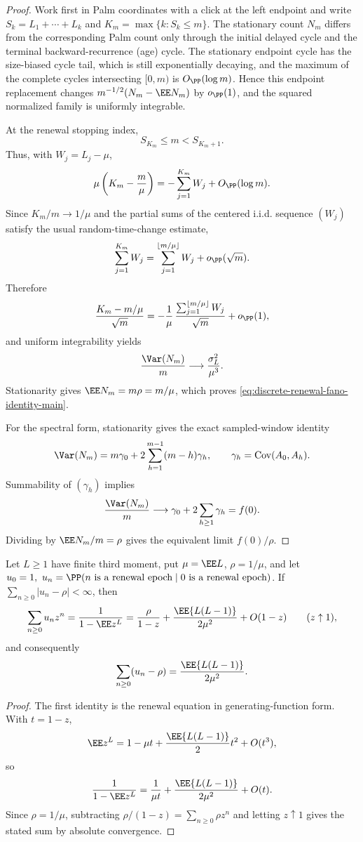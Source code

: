 \begin{proof}
Work first in Palm coordinates with a click at the left endpoint and write
\(S_k=L_1+\cdots+L_k\) and
\(K_m=\max\{k:S_k\le m\}\).  The stationary count \(N_m\) differs from the
corresponding Palm count only through the initial delayed cycle and the
terminal backward-recurrence (age) cycle.  The stationary endpoint cycle has the size-biased
cycle tail, which is still exponentially decaying, and the maximum of the
complete cycles intersecting \([0,m)\) is \(O_{\PP}(\log m)\).  Hence this
endpoint replacement changes \(m^{-1/2}(N_m-\EE N_m)\) by \(o_{\PP}(1)\), and
the squared normalized family is uniformly integrable.

At the renewal stopping index,
\[
S_{K_m}\le m<S_{K_m+1}.
\]
Thus, with \(W_j=L_j-\mu\),
\[
\mu\left(K_m-\frac m\mu\right)
=-\sum_{j=1}^{K_m}W_j+O_{\PP}(\log m).
\]
Since \(K_m/m\to1/\mu\) and the partial sums of the centered i.i.d. sequence
\((W_j)\) satisfy the usual random-time-change estimate,
\[
\sum_{j=1}^{K_m}W_j
=\sum_{j=1}^{\lfloor m/\mu\rfloor}W_j+o_{\PP}(\sqrt m).
\]
Therefore
\[
\frac{K_m-m/\mu}{\sqrt m}
=-\frac1\mu\,
\frac{\sum_{j=1}^{\lfloor m/\mu\rfloor}W_j}{\sqrt m}
+o_{\PP}(1),
\]
and uniform integrability yields
\[
\frac{\Var(N_m)}m
\longrightarrow
\frac{\sigma_L^2}{\mu^3}.
\]
Stationarity gives \(\EE N_m=m\rho=m/\mu\), which proves
\eqref{eq:discrete-renewal-fano-identity-main}.

For the spectral form, stationarity gives the exact sampled-window identity
\[
\Var(N_m)=
m\gamma_0+2\sum_{h=1}^{m-1}(m-h)\gamma_h,\qquad
\gamma_h=\operatorname{Cov}(A_0,A_h).
\]
Summability of \((\gamma_h)\) implies
\[
\frac{\Var(N_m)}m\longrightarrow
\gamma_0+2\sum_{h\ge1}\gamma_h=f(0).
\]
Dividing by \(\EE N_m/m=\rho\) gives the equivalent limit \(f(0)/\rho\).
\end{proof}

\begin{lemma}\label{lem:renewal-gf-expansion-main}
Let \(L\ge1\) have finite third moment, put \(\mu=\EE L\),
\(\rho=1/\mu\), and let
\(u_0=1,\ u_n=\PP(n\ \text{is a renewal epoch}\mid0\ \text{is a renewal epoch})\).
If \(\sum_{n\ge0}|u_n-\rho|<\infty\), then
\[
\sum_{n\ge0}u_nz^n=\frac{1}{1-\EE z^L}
=\frac{\rho}{1-z}
 + \frac{\EE\{L(L-1)\}}{2\mu^2}+O(1-z)
\qquad (z\uparrow1),
\]
and consequently
\[
\sum_{n\ge0}(u_n-\rho)
=\frac{\EE\{L(L-1)\}}{2\mu^2}.
\]
\end{lemma}

\begin{proof}
The first identity is the renewal equation in generating-function form.  With
\(t=1-z\),
\[
\EE z^L
=1-\mu t+\frac{\EE\{L(L-1)\}}2t^2+O(t^3),
\]
so
\[
\frac1{1-\EE z^L}
=\frac1{\mu t}
 +\frac{\EE\{L(L-1)\}}{2\mu^2}+O(t).
\]
Since \(\rho=1/\mu\), subtracting \(\rho/(1-z)=\sum_{n\ge0}\rho z^n\) and
letting \(z\uparrow1\) gives the stated sum by absolute convergence.
\end{proof}

